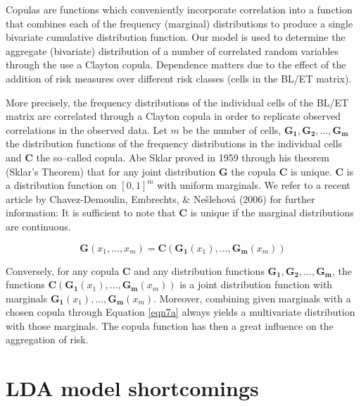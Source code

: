 \documentclass{DissertateUSU}
\begin{document}
Copulas are functions which conveniently incorporate correlation into a
function that combines each of the frequency (marginal) distributions to
produce a single bivariate cumulative distribution function. Our model
is used to determine the aggregate (bivariate) distribution of a number
of correlated random variables through the use a Clayton copula.
Dependence matters due to the effect of the addition of risk measures
over different risk classes (cells in the BL/ET matrix). \medskip

More precisely, the frequency distributions of the individual cells of
the BL/ET matrix are correlated through a Clayton copula in order to
replicate observed correlations in the observed data. Let \(m\) be the
number of cells, \(\mathbf{G_1}, \mathbf{G_2},...,\mathbf{G_m}\) the
distribution functions of the frequency distributions in the individual
cells and \(\mathbf{C}\) the so--called copula. Abe Sklar proved in 1959
through his theorem (Sklar's Theorem) that for any joint distribution
\(\mathbf{G}\) the copula \(\mathbf{C}\) is unique. \(\mathbf{C}\) is a
distribution function on \([0,1]^{m}\) with uniform marginals. We refer
to a recent article by Chavez-Demoulin, Embrechts, \& Nešlehová (2006)
for further information: It is sufficient to note that \(\mathbf{C}\) is
unique if the marginal distributions are continuous.

\singlespacing

\begin{equation}\label{eqn7a}
\mathbf{G}(x_1, \ldots, x_m) = \mathbf{C}\left(\mathbf{G_1}(x_1), \ldots, \mathbf{G_m}(x_m) \right)
\end{equation} \doublespacing

Conversely, for any copula \(\mathbf{C}\) and any distribution functions
\(\mathbf{G_1}, \mathbf{G_2},...,\mathbf{G_m}\), the functions
\(\mathbf{C}\left(\mathbf{G_1}(x_1), \ldots, \mathbf{G_m}(x_m) \right)\)
is a joint distribution function with marginals
\(\mathbf{G_1}(x_1), \ldots, \mathbf{G_m}(x_m)\). Moreover, combining
given marginals with a chosen copula through Equation \ref{eqn7a} always
yields a multivariate distribution with those marginals. The copula
function has then a great influence on the aggregation of risk.

\section{LDA model shortcomings}
\label{ssec:LDA model shortcomings}
\end{document}
